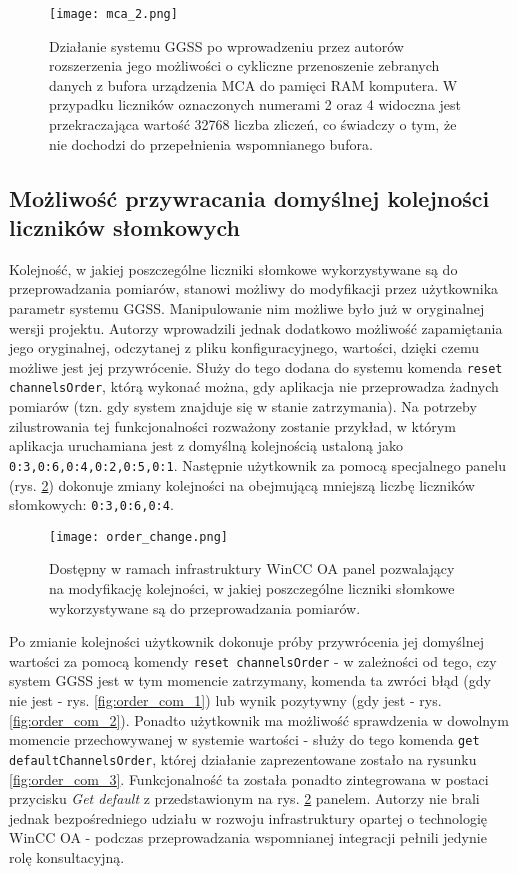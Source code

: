 \begin{figure}[H]
\centering
\texttt{[image: mca\_2.png]}
\caption{Działanie systemu GGSS po wprowadzeniu przez autorów rozszerzenia jego możliwości o cykliczne przenoszenie zebranych danych z bufora urządzenia MCA do pamięci RAM komputera. W przypadku liczników oznaczonych numerami 2 oraz 4 widoczna jest przekraczająca wartość 32768 liczba zliczeń, co świadczy o tym, że nie dochodzi do przepełnienia wspomnianego bufora.}
\label{fig:mca_2}
\end{figure}

\subsection{Możliwość przywracania domyślnej kolejności liczników słomkowych}

Kolejność, w jakiej poszczególne liczniki słomkowe wykorzystywane są do przeprowadzania pomiarów, stanowi możliwy do modyfikacji przez użytkownika parametr systemu GGSS. Manipulowanie nim możliwe było już w oryginalnej wersji projektu. Autorzy wprowadzili jednak dodatkowo możliwość zapamiętania jego oryginalnej, odczytanej z pliku konfiguracyjnego, wartości, dzięki czemu możliwe jest jej przywrócenie. Służy do tego dodana do systemu komenda \lstinline{reset channelsOrder}, którą wykonać można, gdy aplikacja nie przeprowadza żadnych pomiarów (tzn. gdy system znajduje się w stanie zatrzymania). Na potrzeby zilustrowania tej funkcjonalności rozważony zostanie przykład, w którym aplikacja uruchamiana jest z domyślną kolejnością ustaloną jako \lstinline{0:3,0:6,0:4,0:2,0:5,0:1}. Następnie użytkownik za pomocą specjalnego panelu (rys. \ref{fig:order_change}) dokonuje zmiany kolejności na obejmującą mniejszą liczbę liczników słomkowych: \lstinline{0:3,0:6,0:4}.


\begin{figure}[H]
\centering
\texttt{[image: order\_change.png]}
\caption{Dostępny w ramach infrastruktury WinCC OA panel pozwalający na modyfikację kolejności, w jakiej poszczególne liczniki słomkowe wykorzystywane są do przeprowadzania pomiarów.}
\label{fig:order_change}
\end{figure}


Po zmianie kolejności użytkownik dokonuje próby przywrócenia jej domyślnej wartości za pomocą komendy \lstinline{reset channelsOrder} - w zależności od tego, czy system GGSS jest w tym momencie zatrzymany, komenda ta zwróci błąd (gdy nie jest - rys. \ref{fig:order_com_1}) lub wynik pozytywny (gdy jest - rys. \ref{fig:order_com_2}). Ponadto użytkownik ma możliwość sprawdzenia w dowolnym momencie przechowywanej w systemie wartości - służy do tego komenda \lstinline{get defaultChannelsOrder}, której działanie zaprezentowane zostało na rysunku \ref{fig:order_com_3}. Funkcjonalność ta została ponadto zintegrowana w postaci przycisku \emph{Get default} z przedstawionym na rys. \ref{fig:order_change} panelem. Autorzy nie brali jednak bezpośredniego udziału w rozwoju infrastruktury opartej o technologię WinCC OA - podczas przeprowadzania wspomnianej integracji pełnili jedynie rolę konsultacyjną.

